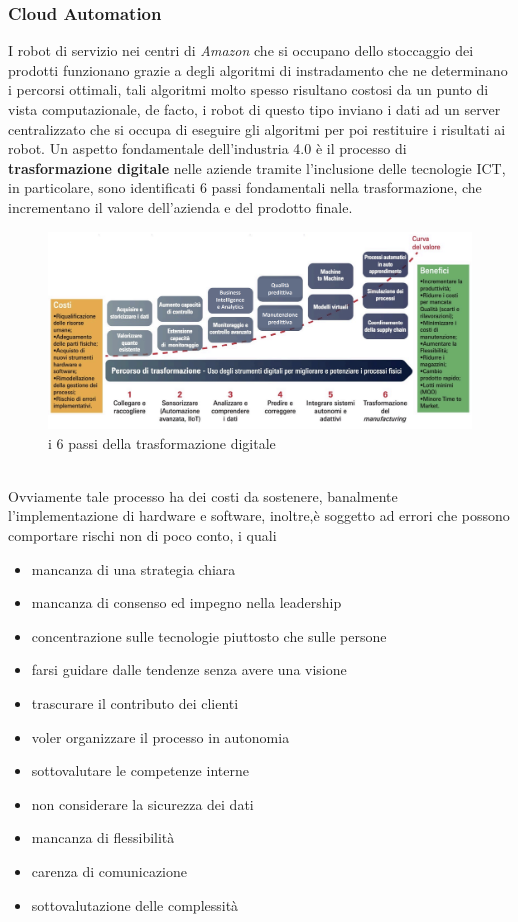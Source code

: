 \documentclass[10pt, letterpaper]{report}
\begin{document}
\subsubsection{Cloud Automation}
I robot di servizio nei centri di \textit{Amazon} che si occupano dello stoccaggio 
dei prodotti funzionano grazie a degli algoritmi di instradamento che 
ne determinano i percorsi ottimali, tali algoritmi molto spesso risultano 
costosi da un punto di vista computazionale, de facto, i robot di questo tipo 
inviano i dati ad un server centralizzato che si occupa di eseguire gli algoritmi per 
poi restituire i risultati ai robot.\acc 
Un aspetto fondamentale dell'industria 4.0 è il processo di 
\textbf{trasformazione digitale} nelle aziende tramite l'inclusione delle 
tecnologie ICT, in particolare, sono identificati 6 passi 
fondamentali nella trasformazione, che incrementano il valore 
dell'azienda e del prodotto finale.
\\\begin{figure}[h!]
    \centering
    \includegraphics[width=1\textwidth ]{images/trasformazioneDigitale.png}
    \caption{i 6 passi della trasformazione digitale}
\end{figure}\\
 Ovviamente tale processo ha dei costi da sostenere, banalmente 
 l'implementazione di hardware e software, inoltre,è soggetto 
 ad errori che possono comportare rischi non di poco conto, i quali\begin{itemize}
    \item mancanza di una strategia chiara 
    \item mancanza di consenso ed impegno nella leadership
    \item concentrazione sulle tecnologie piuttosto che sulle persone 
    \item farsi guidare dalle tendenze senza avere una visione
    \item trascurare il contributo dei clienti
    \item voler organizzare il processo in autonomia 
    \item sottovalutare le competenze interne 
    \item non considerare la sicurezza dei dati 
    \item mancanza di flessibilità 
    \item carenza di comunicazione 
    \item sottovalutazione delle complessità
 \end{itemize}
\end{document}
